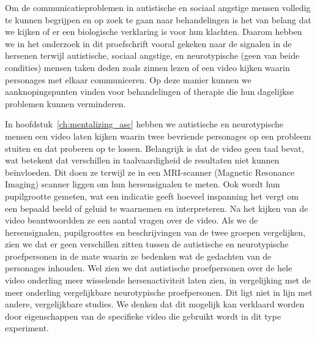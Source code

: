 Om de communicatieproblemen in autistische en sociaal angstige mensen volledig te kunnen begrijpen en op zoek te gaan naar behandelingen is het van belang dat we kijken of er een biologische verklaring is voor hun klachten. Daarom hebben we in het onderzoek in dit proefschrift vooral gekeken naar de signalen in de hersenen terwijl autistische, sociaal angstige, en neurotypische (geen van beide condities) mensen taken deden zoals zinnen lezen of een video kijken waarin personages met elkaar communiceren. Op deze manier kunnen we aanknopingspunten vinden voor behandelingen of therapie die hun dagelijkse problemen kunnen verminderen. 

In hoofdstuk~\ref{ch:mentalizing_asc} hebben we autistische en neurotypische mensen een video laten kijken waarin twee bevriende personages op een probleem stuiten en dat proberen op te lossen. Belangrijk is dat de video geen taal bevat, wat betekent dat verschillen in taalvaardigheid de resultaten niet kunnen be\"invloeden. Dit doen ze terwijl ze in een MRI-scanner (Magnetic Resonance Imaging) scanner liggen om hun hersensignalen te meten. Ook wordt hun pupilgrootte gemeten, wat een indicatie geeft hoeveel inspanning het vergt om een bepaald beeld of geluid te waarnemen en interpreteren. Na het kijken van de video beantwoordden ze een aantal vragen over de video. Als we de hersensignalen, pupilgroottes en beschrijvingen van de twee groepen vergelijken, zien we dat er geen verschillen zitten tussen de autistische en neurotypische proefpersonen in de mate waarin ze bedenken wat de gedachten van de personages inhouden. Wel zien we dat autistische proefpersonen over de hele video onderling meer wisselende hersenactiviteit laten zien, in vergelijking met de meer onderling vergelijkbare neurotypische proefpersonen. Dit ligt niet in lijn met andere, vergelijkbare studies. We denken dat dit mogelijk kan verklaard worden door eigenschappen van de specifieke video die gebruikt wordt in dit type experiment.

